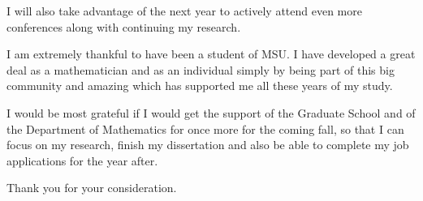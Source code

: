 \documentclass[11pt]{amsart} %
\begin{document}
I will also take advantage of the next year to actively attend even more conferences along with continuing my research.


\bigskip

I am extremely thankful to have been a student of MSU. I have developed a great deal as a mathematician and as an individual simply by being part of this big community and amazing which has supported me all these years of my study.

I would be most grateful if I would get the support of the Graduate School and of the Department of Mathematics for once more for the coming fall, so that I can focus on my research, finish my dissertation and also be able to complete my job applications for the year after.

Thank you for your consideration.


\printbibliography
\end{document}
